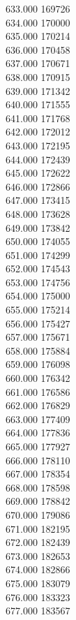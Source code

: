 { 633.000	169726 \\
 634.000	170000 \\
 635.000	170214 \\
 636.000	170458 \\
 637.000	170671 \\
 638.000	170915 \\
 639.000	171342 \\
 640.000	171555 \\
 641.000	171768 \\
 642.000	172012 \\
 643.000	172195 \\
 644.000	172439 \\
 645.000	172622 \\
 646.000	172866 \\
 647.000	173415 \\
 648.000	173628 \\
 649.000	173842 \\
 650.000	174055 \\
 651.000	174299 \\
 652.000	174543 \\
 653.000	174756 \\
 654.000	175000 \\
 655.000	175214 \\
 656.000	175427 \\
 657.000	175671 \\
 658.000	175884 \\
 659.000	176098 \\
 660.000	176342 \\
 661.000	176586 \\
 662.000	176829 \\
 663.000	177409 \\
 664.000	177836 \\
 665.000	177927 \\
 666.000	178110 \\
 667.000	178354 \\
 668.000	178598 \\
 669.000	178842 \\
 670.000	179086 \\
 671.000	182195 \\
 672.000	182439 \\
 673.000	182653 \\
 674.000	182866 \\
 675.000	183079 \\
 676.000	183323 \\
 677.000	183567 \\
}
